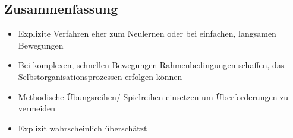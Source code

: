 \subsection{Zusammenfassung}

\begin{itemize}
    \item Explizite Verfahren eher zum Neulernen oder bei einfachen, langsamen Bewegungen
    \item Bei komplexen, schnellen Bewegungen Rahmenbedingungen schaffen, das Selbstorganisationsprozessen erfolgen können
    \item Methodische Übungsreihen/ Spielreihen einsetzen um Überforderungen zu vermeiden
    \item Explizit wahrscheinlich überschätzt
\end{itemize}
